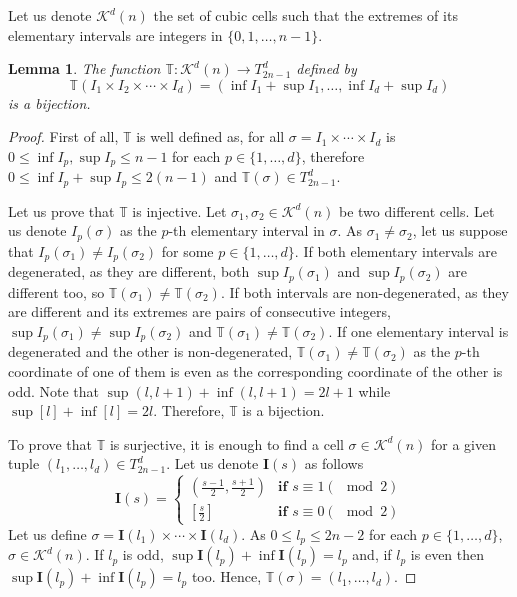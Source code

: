 \documentclass[journal]{IEEEtran}
\newtheorem{lemma}{Lemma}
\begin{document}
Let us denote $\mathcal{K}^d(n)$ the set of cubic cells such that the extremes of its 
elementary intervals are integers in $\{0, 1, \ldots, n-1\}$.
\begin{lemma}
The function $\mathbb{T}:\mathcal{K}^d(n) \rightarrow T_{2n-1}^d$ defined by
$$
\mathbb{T}(I_1 \times I_2 \times \cdots \times I_d) = 
(\inf I_1 + \sup I_1, \ldots, \inf I_d + \sup I_d)
$$ is a bijection.
\end{lemma}
\begin{proof}
First of all, $\mathbb{T}$ is well defined as, for all $\sigma = I_1 \times \cdots \times I_d$ is 
$0 \leq \inf I_p, \sup I_p \leq n-1$ for each $p \in \{1, \ldots, d\}$, therefore 
$0 \leq \inf I_p + \sup I_p \leq 2(n-1)$ and $\mathbb{T}(\sigma) \in T_{2n-1}^d$.

Let us prove that $\mathbb{T}$ is injective. Let $\sigma_1, \sigma_2 \in \mathcal{K}^d(n)$ 
be two different cells. Let us denote $I_p(\sigma)$ as the $p$-th elementary interval 
in $\sigma$. As $\sigma_1 \neq \sigma_2$, let us suppose that $I_p(\sigma_1) \neq I_p(\sigma_2)$ 
for some $p \in \{1, \ldots, d\}$. If both elementary intervals are degenerated, as they are different, 
both $\sup I_p(\sigma_1)$ and $\sup I_p(\sigma_2)$ are different too, so 
$\mathbb{T}(\sigma_1) \neq \mathbb{T}(\sigma_2)$. If both intervals are non-degenerated, 
as they are different and its extremes are pairs of consecutive integers, 
$\sup I_p(\sigma_1) \neq \sup I_p(\sigma_2)$ and $\mathbb{T}(\sigma_1) \neq \mathbb{T}(\sigma_2)$. 
If one elementary interval is degenerated and the other is non-degenerated, 
$\mathbb{T}(\sigma_1) \neq \mathbb{T}(\sigma_2)$ as the $p$-th coordinate of one of them is even as the 
corresponding coordinate of the other is odd. Note that $\sup (l, l+1) + \inf (l, l+1) = 2l+1$ while 
$\sup [l] + \inf [l] = 2l$. Therefore, $\mathbb{T}$ is a bijection.

To prove that $\mathbb{T}$ is surjective, it is enough to find a cell $\sigma \in \mathcal{K}^d(n)$ for
a given tuple $(l_1, \ldots, l_d) \in T_{2n-1}^d$. Let us denote $\mathbf{I}(s)$ as follows
$$
\mathbf{I}(s)= \left \{ 
\begin{array}{ll}
\left(\frac{s-1}{2}, \frac{s+1}{2}\right)		& \textbf{if } s \equiv 1 (\mod 2)\\
\left[\frac{s}{2}\right]						& \textbf{if } s \equiv 0 (\mod 2)
\end{array}
\right.
$$
Let us define $\sigma = \mathbf{I}(l_1) \times \cdots \times \mathbf{I}(l_d)$. As $0 \leq l_p \leq 2n-2$ for 
each $p \in \{1, \ldots, d\}$, $\sigma \in \mathcal{K}^d(n)$. If $l_p$ is odd, 
$\sup \mathbf{I}(l_p) + \inf \mathbf{I}(l_p) = l_p$ and, if $l_p$ is even then 
$\sup \mathbf{I}(l_p) + \inf \mathbf{I}(l_p) = l_p$ too. Hence, $\mathbb{T}(\sigma) = (l_1, \ldots, l_d)$.
\end{proof}
\end{document}
